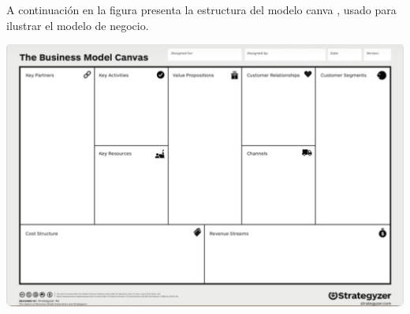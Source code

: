 A continuación en la figura %
presenta la estructura del modelo canva , usado para ilustrar el modelo de negocio.
\begin{adjustbox}{
    center,
    caption=[{Modelo Canva}]{\centering Modelo Canva. Fuente:(Sitio web: Modelo de negocio Canvas: Qué es y cómo usarlo, según Ylse Roa, 2023)},
    label={plantillaModeloCanva},
    nofloat=figure}

    \includegraphics[scale=0.4]{Content/Images/modelo canva plantilla.jpeg}

\end{adjustbox}